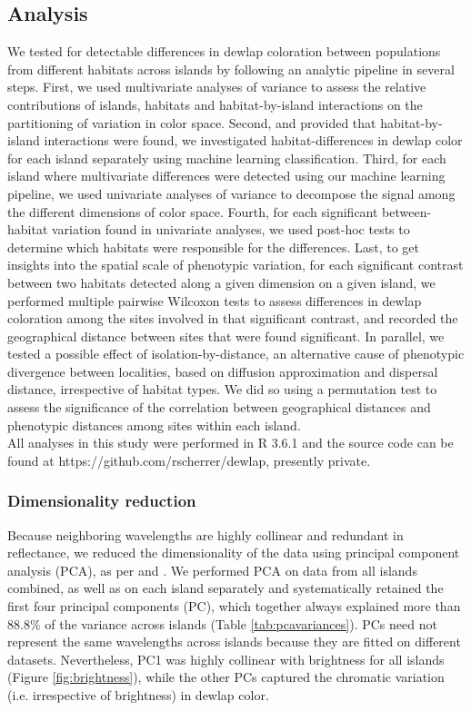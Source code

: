 \subsection*{Analysis}

We tested for detectable differences in dewlap coloration between populations from different habitats across islands by following an analytic pipeline in several steps. First, we used multivariate analyses of variance to assess the relative contributions of islands, habitats and habitat-by-island interactions on the partitioning of variation in color space. Second, and provided that habitat-by-island interactions were found, we investigated habitat-differences in dewlap color for each island separately using machine learning classification. Third, for each island where multivariate differences were detected using our machine learning pipeline, we used univariate analyses of variance to decompose the signal among the different dimensions of color space. Fourth, for each significant between-habitat variation found in univariate analyses, we used post-hoc tests to determine which habitats were responsible for the differences. Last, to get insights into the spatial scale of phenotypic variation, for each significant contrast between two habitats detected along a given dimension on a given island, we performed multiple pairwise Wilcoxon tests to assess differences in dewlap coloration among the sites involved in that significant contrast, and recorded the geographical distance between sites that were found significant. In parallel, we tested a possible effect of isolation-by-distance, an alternative cause of phenotypic divergence between localities, based on diffusion approximation and dispersal distance, irrespective of habitat types. We did so using a permutation test to assess the significance of the correlation between geographical distances and phenotypic distances among sites within each island.\\

All analyses in this study were performed in R 3.6.1 \citep{RCoreTeam2019} and the source code can be found at https://github.com/rscherrer/dewlap, presently private.

\subsubsection*{Dimensionality reduction}

Because neighboring wavelengths are highly collinear and redundant in reflectance, we reduced the dimensionality of the data using principal component analysis (PCA), as per \citet{Cuthill1999} and \citet{Leal2002}. We performed PCA on data from all islands combined, as well as on each island separately and systematically retained the first four principal components (PC), which together always explained more than $88.8\%$ of the variance across islands (Table \ref{tab:pcavariances}). PCs need not represent the same wavelengths across islands because they are fitted on different datasets. Nevertheless, PC1 was highly collinear with brightness for all islands (Figure \ref{fig:brightness}), while the other PCs captured the chromatic variation (i.e. irrespective of brightness) in dewlap color.

